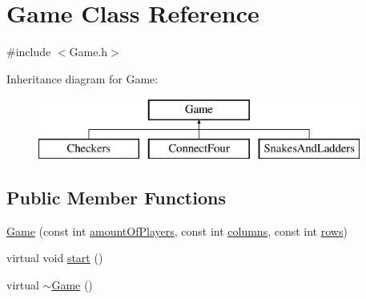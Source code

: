 \hypertarget{classGame}{\section{Game Class Reference}
\label{classGame}
}


{\ttfamily \#include $<$Game.\-h$>$}

Inheritance diagram for Game\-:\begin{figure}[H]
\begin{center}
\leavevmode
\includegraphics[height=2.000000cm]{classGame}
\end{center}
\end{figure}
\subsection*{Public Member Functions}
\begin{DoxyCompactItemize}
\item 
\hyperlink{classGame_ad2ad634188c8b6151d74cbcc4f858d81}{Game} (const int \hyperlink{classGame_a2a64a5ac5fe7466f02392d7bc75cf372}{amount\-Of\-Players}, const int \hyperlink{classGame_a33dcee5dd512148a0b12aa7fba41b5da}{columns}, const int \hyperlink{classGame_ae882486dec6d9507bbef7f44aaf07db5}{rows})
\item 
virtual void \hyperlink{classGame_a3d9b98f7c4a96ecf578f75b96c9f0e90}{start} ()
\item 
virtual \hyperlink{classGame_ae3d112ca6e0e55150d2fdbc704474530}{$\sim$\-Game} ()
\end{DoxyCompactItemize}
